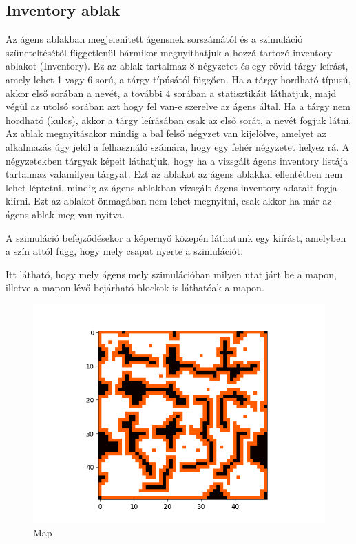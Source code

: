 \subsection{Inventory ablak}
Az ágens ablakban megjelenített ágensnek sorszámától és a szimuláció szüneteltésétől függetlenül bármikor megnyithatjuk a hozzá tartozó inventory ablakot (Inventory).
Ez az ablak tartalmaz 8 négyzetet és egy rövid tárgy leírást, amely lehet 1 vagy 6 sorú, a tárgy típúsától függően. Ha a tárgy hordható típusú, akkor első sorában a nevét, 
a további 4 sorában a statisztikáit láthatjuk, majd végül az utolsó sorában azt hogy fel van-e szerelve az ágens által. Ha a tárgy nem hordható (kulcs), 
akkor a tárgy leírásában csak az első sorát, a nevét fogjuk látni.
Az ablak megnyitásakor mindig a bal felső négyzet van kijelölve, amelyet az alkalmazás úgy jelöl a felhasználó számára, hogy egy fehér négyzetet helyez rá.
A négyzetekben tárgyak képeit láthatjuk, hogy ha a vizsgált ágens inventory listája tartalmaz valamilyen tárgyat.
Ezt az ablakot az ágens ablakkal ellentétben nem lehet léptetni, mindig az ágens ablakban vizsgált ágens inventory adatait fogja kiírni.
Ezt az ablakot önmagában nem lehet megnyitni, csak akkor ha már az ágens ablak meg van nyitva.


A szimuláció befejződésekor a képernyő közepén láthatunk egy kiírást, amelyben a szín attól függ, hogy mely csapat nyerte a szimulációt.


Itt látható, hogy mely ágens mely szimulációban milyen utat járt be a mapon, illetve a mapon lévő bejárható blockok is láthatóak a mapon.

\begin{figure}[!ht]
	\centering
	\includegraphics[scale=0.70]{images/map.png}
	\caption{Map}
	\label{fig:map}
\end{figure}


